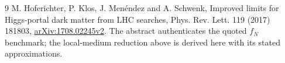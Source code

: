\documentclass[11pt]{article}
\begin{document}
\begin{thebibliography}{9}
 M. Hoferichter, P. Klos, J. Men\'endez and
A. Schwenk, Improved limits for Higgs-portal dark matter from LHC searches,
Phys. Rev. Lett. 119 (2017) 181803,
\href{https://arxiv.org/abs/1708.02245v2}{arXiv:1708.02245v2}.
The abstract authenticates the quoted $f_N$ benchmark; the local-medium
reduction above is derived here with its stated approximations.
\end{thebibliography}
\end{document}
